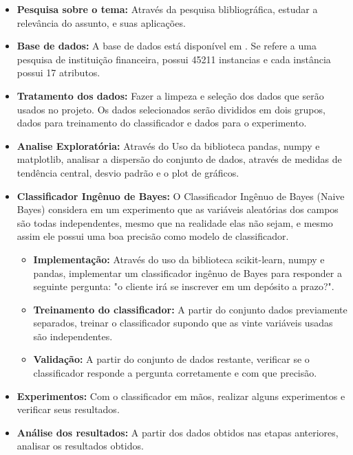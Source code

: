 \documentclass[conference]{IEEEtran}
\begin{document}
\begin{itemize}
\item \textbf{Pesquisa sobre o tema:}
Através da pesquisa blibliográfica, estudar  a relevância do assunto, e suas aplicações.
\item \textbf{Base de dados:}
A base de dados está disponível em \cite{b1}. Se refere a uma pesquisa de instituição financeira, possui 45211 instancias e cada instância possui 17 atributos.
\item \textbf{Tratamento dos dados:}
Fazer a limpeza e seleção dos dados que serão usados no projeto. Os dados selecionados serão divididos em dois grupos, dados para treinamento do classificador e dados para o experimento.
\item \textbf{Analise Exploratória:}
Através do Uso da biblioteca pandas, numpy e matplotlib, analisar a dispersão do conjunto de dados,
através de medidas de tendência central, desvio padrão e o plot de gráficos.

\item \textbf{Classificador Ingênuo de Bayes:}
	O Classificador Ingênuo de Bayes (Naive Bayes) considera em um experimento que as variáveis aleatórias dos campos são todas independentes, mesmo que na realidade elas não sejam, e mesmo assim ele possui uma boa precisão como modelo de classificador.
    \begin{itemize}
        \item \textbf{Implementação:}
        Através do uso da biblioteca scikit-learn, numpy e pandas, implementar um classificador ingênuo de Bayes
        para responder a seguinte pergunta: "o cliente irá se inscrever em um depósito a prazo?".
        \item \textbf{Treinamento do classificador:}
        A partir do conjunto dados previamente separados, treinar o classificador supondo que as vinte variáveis usadas são independentes.
        \item \textbf{Validação:}
        A partir do conjunto de dados restante, verificar se o classificador responde a pergunta corretamente e com que precisão.
    \end{itemize}
\item \textbf{Experimentos:}
Com o classificador em mãos, realizar alguns experimentos e verificar seus resultados.
\item \textbf{Análise dos resultados:}
A partir dos dados obtidos nas etapas anteriores, analisar os resultados obtidos.
\end{itemize}
\end{document}
